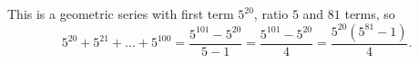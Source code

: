 This is a geometric series with first term $5^{20}$, ratio $5$ and $81$ terms, so
\[
5^{20}+5^{21}+\dots+5^{100}=\dfrac{5^{101}-5^{20}}{5-1}=\boxed{\dfrac{5^{101}-5^{20}}{4}}=\dfrac{5^{20}\left(5^{81}-1\right)}{4}.
\]
